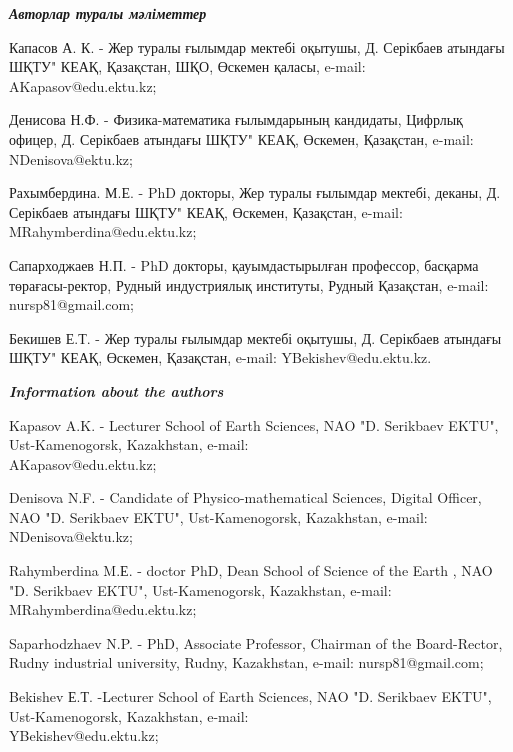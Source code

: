 \begin{authorinfo}
\hspace{1em}\emph{{\bfseries Авторлар туралы мәліметтер}}

Капасов А. К. - Жер туралы ғылымдар мектебі оқытушы, Д. Серікбаев
атындағы ШҚТУ" КЕАҚ, Қазақстан, ШҚО, Өскемен қаласы, e-mail:
AKapasov@edu.ektu.kz;

Денисова Н.Ф. - Физика-математика ғылымдарының кандидаты, Цифрлық
офицер, Д. Серікбаев атындағы ШҚТУ" КЕАҚ, Өскемен, Қазақстан, e-mail:
NDenisova@ektu.kz;

Рахымбердина. М.Е. - PhD докторы, Жер туралы ғылымдар мектебі, деканы,
Д. Серікбаев атындағы ШҚТУ" КЕАҚ, Өскемен, Қазақстан, e-mail:
MRahymberdina@edu.ektu.kz;

Сапарходжаев Н.П. - PhD докторы, қауымдастырылған профессор, басқарма
төрағасы-ректор, Рудный индустриялық институты, Рудный Қазақстан, e-mail:
nursp81@gmail.com;

Бекишев Е.Т. - Жер туралы ғылымдар мектебі оқытушы, Д. Серікбаев
атындағы ШҚТУ" КЕАҚ, Өскемен, Қазақстан, e-mail:
YBekishev@edu.ektu.kz.

\hspace{1em}\emph{{\bfseries Information about the authors}}

Kapasov A.K. - Lecturer School of Earth Sciences, NAO "D. Serikbaev
EKTU", Ust-Kamenogorsk, Kazakhstan,
e-mail: \\AKapasov@edu.ektu.kz;

Denisova N.F. - Candidate of Physico-mathematical Sciences, Digital
Officer, NAO "D. Serikbaev EKTU", Ust-Kamenogorsk, Kazakhstan, e-mail:
NDenisova@ektu.kz;

Rahymberdina M.Е. - doctor PhD, Dean School of Science of the Earth ,
NAO "D. Serikbaev EKTU", Ust-Kamenogorsk, Kazakhstan,  e-mail:
MRahymberdina@edu.ektu.kz;

Saparhodzhaev N.P. - PhD, Associate Professor, Chairman of the
Board-Rector, Rudny industrial university, Rudny, Kazakhstan, e-mail:
nursp81@gmail.com;

Bekishev Е.Т. -Lecturer School of Earth Sciences, NAO "D. Serikbaev
EKTU", Ust-Kamenogorsk, Kazakhstan, e-mail: \\YBekishev@edu.ektu.kz;
\end{authorinfo}
